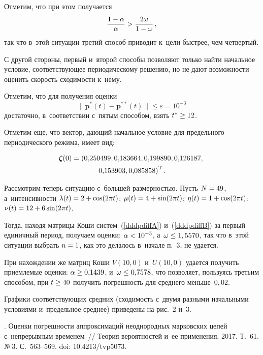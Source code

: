 \begin{multicols}{2}
Отметим, что при этом получается 
$$
\displaystyle\frac{\displaystyle 1-\alpha\mathstrut}{\displaystyle \alpha\mathstrut}> \displaystyle\frac{\displaystyle 2\omega\mathstrut}{\displaystyle 1-\omega\mathstrut}\,,
$$
так что в~этой ситуации третий способ приводит к~цели быстрее, чем 
четвертый.

С другой стороны, первый и~второй способы позволяют только найти начальное 
условие, соответствующее
периодическому решению, но не дают возможности оценить скорость 
сходимости к~нему.

Отметим, что для получения оценки 
$$
\|\mathbf{p}^*(t)-\mathbf{p}^{**}(t)\|\le
\varepsilon=10^{-3}
$$ 
достаточно, в~соответствии с~пятым способом, взять $t^* \hm\ge 12$.


Отметим еще, что вектор, дающий начальное условие для предельного 
периодического режима, имеет вид:

\noindent
\begin{multline*}
\boldsymbol{\zeta}(0) = \left(0{,}250499, 0{,}183664, 0{,}199890, 0{,}126187, \right.\\
\left.0{,}153903, 0{,}085858\right)^{\mathrm{T}}.
\end{multline*}


\medskip

Рассмотрим теперь ситуацию с~большей размерностью. Пусть $N\hm=49$, 
а~интенсивности
$\lambda(t)\hm=2\hm+\cos(2 \pi t)$; $\mu(t)\hm=4\hm+\sin(2 \pi t)$; 
$\eta(t)\hm=1\hm+\cos(2 \pi t)$; $\nu(t)\hm=12\hm+6\sin(2 \pi t)$.

Тогда, находя матрицы Коши систем~(\ref{dddpdiffA}) и~(\ref{dddpdiffB}) 
за первый единичный период, получаем оценки: 
$\alpha \hm< 10^{-5}$, а~$ \omega\hm\le 1,5570$, так что в~этой ситуации
выбрать $n\hm=1$, как это делалось в~начале п.~3, не удается.

При нахождении же матриц Коши $V(10,0)$ и~$U(10,0)$ удается получить
приемлемые оценки: $ \alpha \hm\ge 0{,}1439 $, и~$ \omega\hm\le 0{,}7578 
$,
что позволяет, пользуясь третьим способом, при $t \hm\ge 40$ получить
погрешность для среднего меньше~$0{,}02$.

Графики соответствующих средних (сходимость с~двумя разными начальными 
условиями и~предельное среднее) приведены на рис.~2 и~3.





{\small\frenchspacing
 {%
 \begin{thebibliography}{99}



.
Оценки погрешности аппроксимаций неоднородных марковских цепей 
с~непрерывным временем~// Теория вероятностей и~ее применения, 2017. Т.~61. №\,3. С.~563--569. doi:
10.4213/tvp5073.


\end{thebibliography}}}
\end{multicols}
